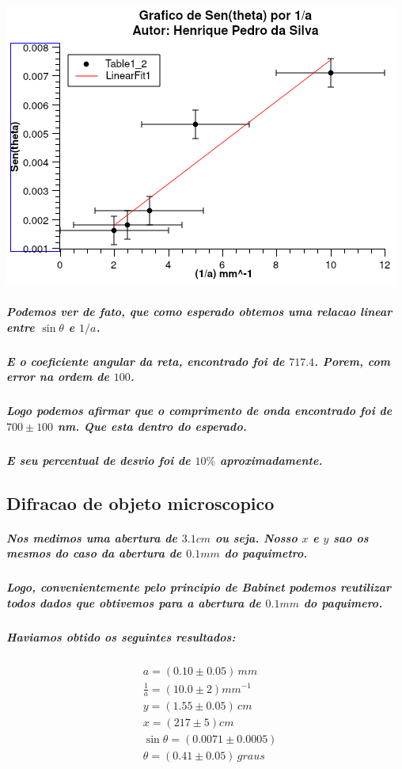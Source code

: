 \documentclass[12pt,twoside, a4paper, twocolumn]{article}
\begin{document}
\begin{adjustbox}{scale=0.70}
  \includegraphics{Graph1.png}
\end{adjustbox}

\subparagraph*{Podemos ver de fato, que como esperado obtemos uma relacao linear entre $\sin{\theta}$ e $1/a$.}

\subparagraph*{E o coeficiente angular da reta, encontrado foi de $717.4$. Porem, com error na ordem de $100$.}

\subparagraph*{Logo podemos afirmar que o comprimento de onda encontrado foi de $700 \pm 100$ nm. Que esta dentro do esperado.}

\subparagraph*{E seu percentual de desvio foi de $10\%$ aproximadamente.}

\pagebreak

\newpage

\subsection{Difracao de objeto microscopico}

\subparagraph*{Nos medimos uma abertura de $3.1cm$ ou seja. Nosso $x$ e $y$ sao os mesmos do caso da abertura de $0.1mm$ do paquimetro.}

\subparagraph*{Logo, convenientemente pelo principio de Babinet podemos reutilizar todos dados que obtivemos para a abertura de $0.1mm$ do paquimero.}

\subparagraph*{Haviamos obtido os seguintes resultados:}

\begin{equation}
  \begin{aligned}
     & a =(0.10 \pm 0.05)\,mm             \\
     & \frac{1}{a} = (10.0 \pm 2)mm^{-1}  \\
     & y = (1.55 \pm 0.05)\,cm            \\
     & x = (217 \pm 5)cm                  \\
     & \sin{\theta} = (0.0071 \pm 0.0005) \\
     & \theta = (0.41 \pm 0.05)\,graus    \\
  \end{aligned}
\end{equation}
\end{document}
